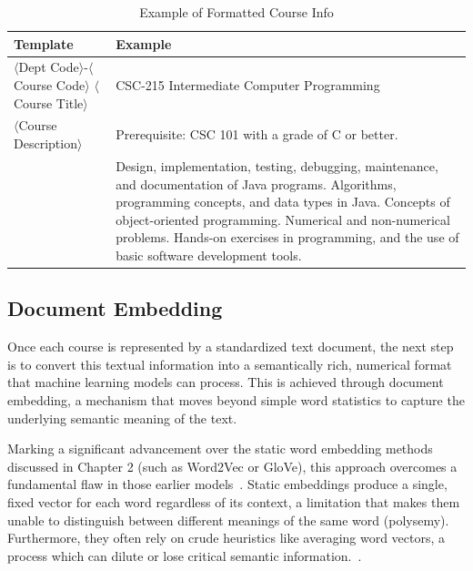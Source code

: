 \begin{table}[tb]
    \captionsetup{skip=5pt}
    \centering
    \caption{Example of Formatted Course Info}
    \begin{tabular}{p{}p{}}
        \toprule
        \textbf{Template} & \textbf{Example} \\
        \midrule
        \small
        \(\langle\)Dept Code\(\rangle\)-\(\langle\)Course Code\(\rangle\) \(\langle\)Course Title\(\rangle\)     & 
    \small CSC-215  Intermediate Computer Programming \\
        
    \small \(\langle\)Course Description\(\rangle\) &  
    \small Prerequisite: CSC 101 with a grade of C or better. \\
        & 
    \small Design, implementation, testing, debugging, maintenance, and documentation of Java programs. Algorithms, programming concepts, and data types in Java. Concepts of object-oriented programming. Numerical and non-numerical problems. Hands-on exercises in programming, and the use of basic software development tools. \\
        \bottomrule
    \end{tabular}
    \label{tbl:formattedcourse}
\end{table}

\subsection{Document Embedding}\label{ch:3.2.2.1}
Once each course is represented by a standardized text document, the next step is to convert this textual information into a semantically rich, numerical format that machine learning models can process. This is achieved through document embedding, a mechanism that moves beyond simple word statistics to capture the underlying semantic meaning of the text.  

Marking a significant advancement over the static word embedding methods discussed in Chapter 2 (such as Word2Vec or GloVe), this approach overcomes a fundamental flaw in those earlier models~\cite{mikolov2013,pennington2014glove}. Static embeddings produce a single, fixed vector for each word regardless of its context, a limitation that makes them unable to distinguish between different meanings of the same word (polysemy). Furthermore, they often rely on crude heuristics like averaging word vectors, a process which can dilute or lose critical semantic information.~\cite{JiangPardosMulti2VecEDM2020}.

